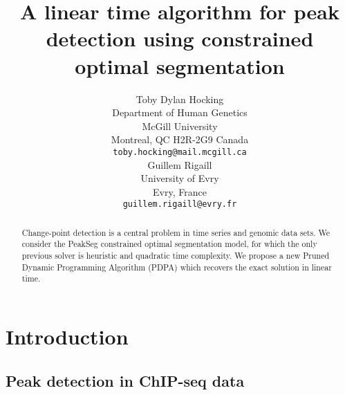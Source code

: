 \documentclass{article}
\begin{document}
\title{A linear time algorithm for peak detection using constrained
  optimal segmentation}

\author{
  Toby Dylan Hocking\\
  Department of Human Genetics\\
  McGill University\\
  Montreal, QC H2R-2G9 Canada \\
  \texttt{toby.hocking@mail.mcgill.ca} \\
  \And
  Guillem Rigaill \\
  University of Evry \\
  Evry, France \\
  \texttt{guillem.rigaill@evry.fr} \\
}

\maketitle

\begin{abstract}
  Change-point detection is a central problem in time series and
  genomic data sets. We consider the PeakSeg constrained optimal
  segmentation model, for which the only previous solver is heuristic
  and quadratic time complexity. We propose a new Pruned Dynamic
  Programming Algorithm (PDPA) which recovers the exact solution in
  linear time. 
\end{abstract}

\section{Introduction}

\subsection{Peak detection in ChIP-seq data}
\end{document}
